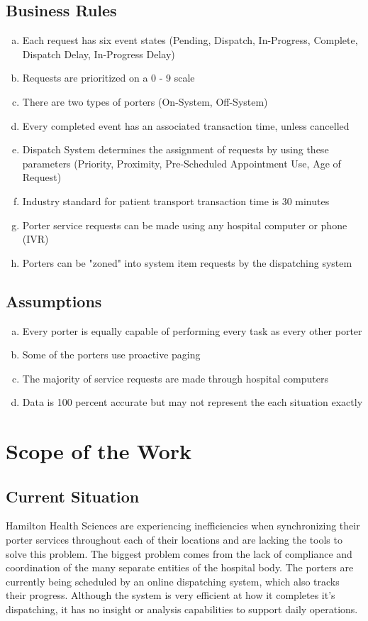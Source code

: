 \documentclass[paper=letter, fontsize=10pt]{scrartcl}
\numberwithin{equation}{section}		%
\numberwithin{figure}{section}			%
\numberwithin{table}{section}				%
\begin{document}
\subsection{Business Rules}
\begin{enumerate}[(a)] 
	\item Each request has six event states (Pending, Dispatch, In-Progress, Complete, Dispatch Delay, In-Progress Delay)
	\item Requests are prioritized on a 0 - 9 scale
	\item There are two types of porters (On-System, Off-System)
	\item Every completed event has an associated transaction time, unless cancelled
	\item Dispatch System determines the assignment of requests by using these parameters (Priority, Proximity, Pre-Scheduled Appointment Use, Age of Request) 
	\item Industry standard for patient transport transaction time is 30 minutes
	\item Porter service requests can be made using any hospital computer or phone (IVR)
	\item Porters can be "zoned" into system item requests by the dispatching system  
\end{enumerate}	    
\subsection{Assumptions}
\begin{enumerate}[(a)]
	\item Every porter is equally capable of performing every task as every other porter
	\item Some of the porters use proactive paging  
	\item The majority of service requests are made through hospital computers
	\item Data is 100 percent accurate but may not represent the each situation exactly 
\end{enumerate}

\section{Scope of the Work}
\subsection{Current Situation}
Hamilton Health Sciences are experiencing inefficiencies when synchronizing their porter services throughout each of their locations and are lacking the tools to solve this problem. The biggest problem comes from the lack of compliance and coordination of the many separate entities of the hospital body. The porters are currently being scheduled by an online dispatching system, which also tracks their progress. Although the system is very efficient at how it completes it's dispatching, it has no insight or analysis capabilities to support daily operations. 
\end{document}
